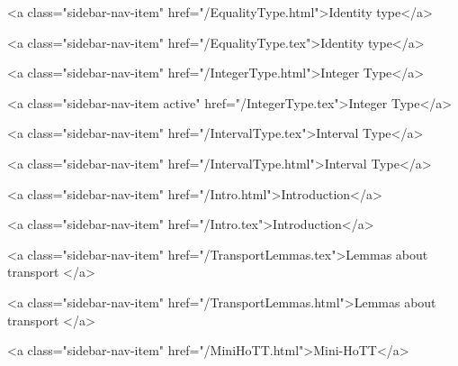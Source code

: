       
        
          <a class="sidebar-nav-item" href="/EqualityType.html">Identity type</a>
        
      
    
      
        
          <a class="sidebar-nav-item" href="/EqualityType.tex">Identity type</a>
        
      
    
      
        
          <a class="sidebar-nav-item" href="/IntegerType.html">Integer Type</a>
        
      
    
      
        
          <a class="sidebar-nav-item active" href="/IntegerType.tex">Integer Type</a>
        
      
    
      
        
          <a class="sidebar-nav-item" href="/IntervalType.tex">Interval Type</a>
        
      
    
      
        
          <a class="sidebar-nav-item" href="/IntervalType.html">Interval Type</a>
        
      
    
      
        
          <a class="sidebar-nav-item" href="/Intro.html">Introduction</a>
        
      
    
      
        
          <a class="sidebar-nav-item" href="/Intro.tex">Introduction</a>
        
      
    
      
        
          <a class="sidebar-nav-item" href="/TransportLemmas.tex">Lemmas about transport </a>
        
      
    
      
        
          <a class="sidebar-nav-item" href="/TransportLemmas.html">Lemmas about transport </a>
        
      
    
      
        
          <a class="sidebar-nav-item" href="/MiniHoTT.html">Mini-HoTT</a>
        
      
    
